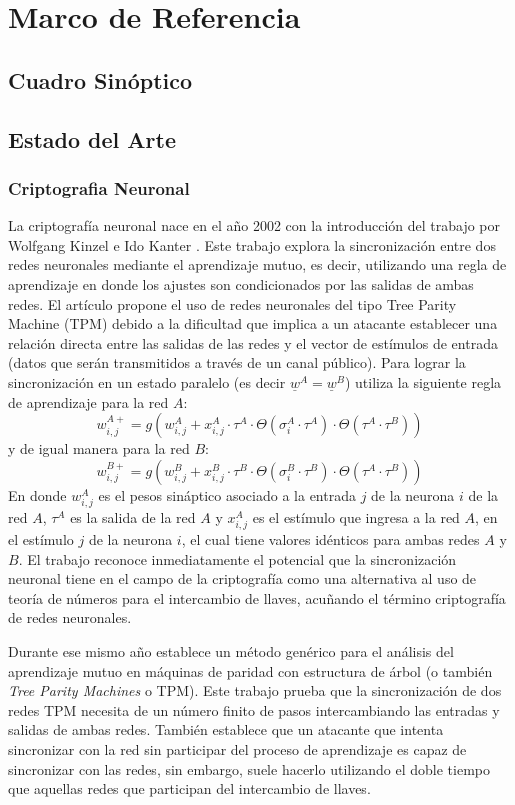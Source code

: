 \chapter{Marco de Referencia}
\section{Cuadro Sinóptico}
\section{Estado del Arte}

\subsection{Criptografia Neuronal}

La criptografía neuronal nace en el año 2002 con la introducción del trabajo por Wolfgang Kinzel e Ido Kanter \cite{kinzel2002interactingneuralnetworkscryptography}. Este trabajo explora la sincronización entre dos redes neuronales mediante el aprendizaje mutuo, es decir, utilizando una regla de aprendizaje en donde los ajustes son condicionados por las salidas de ambas redes. El artículo propone el uso de redes neuronales del tipo Tree Parity Machine (TPM) debido a la dificultad que implica a un atacante establecer una relación directa entre las salidas de las redes y el vector de estímulos de entrada (datos que serán transmitidos a través de un canal público).
Para lograr la sincronización en un estado paralelo (es decir $\underline{w}^A = \underline{w}^B$) utiliza la siguiente regla de aprendizaje para la red $A$:
$$ w^{A+}_{i,j} = g(w^{A}_{i,j} + x^{A}_{i,j} \cdot \tau^A \cdot \Theta(\sigma^A_{i}\cdot\tau^A) \cdot \Theta(\tau^A\cdot\tau^B)) $$
y de igual manera para la red $B$:
$$ w^{B+}_{i,j} = g(w^{B}_{i,j} + x^{B}_{i,j} \cdot \tau^B \cdot \Theta(\sigma^B_{i}\cdot\tau^B) \cdot \Theta(\tau^A\cdot\tau^B)) $$
En donde $w^{A}_{i,j}$ es el pesos sináptico asociado a la entrada $j$ de la neurona $i$ de la red $A$, $\tau^A$ es la salida de la red $A$ y $x^{A}_{i,j}$ es el estímulo que ingresa a la red $A$, en el estímulo $j$ de la neurona $i$, el cual tiene valores idénticos para ambas redes $A$ y $B$.
El trabajo reconoce inmediatamente el potencial que la sincronización neuronal tiene en el campo de la criptografía como una alternativa al uso de teoría de números para el intercambio de llaves, acuñando el término criptografía de redes neuronales.

Durante ese mismo año \cite{PhysRevE.66.066135} establece un método genérico para el análisis del aprendizaje mutuo en máquinas de paridad con estructura de árbol (o también \textit{Tree Parity Machines} o TPM). Este trabajo prueba que la sincronización de dos redes TPM necesita de un número finito de pasos intercambiando las entradas y salidas de ambas redes. También establece que un atacante que intenta sincronizar con la red sin participar del proceso de aprendizaje es capaz de sincronizar con las redes, sin embargo, suele hacerlo utilizando el doble tiempo que aquellas redes que participan del intercambio de llaves.

